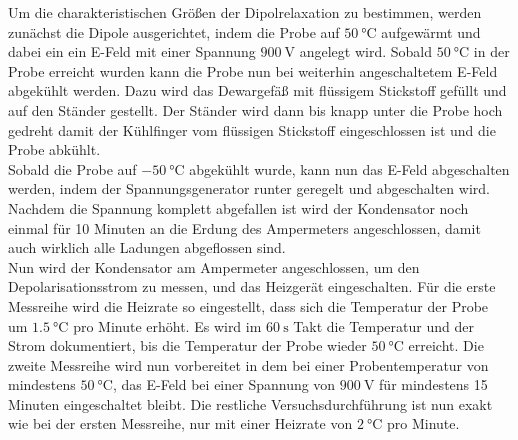     Um die charakteristischen Größen der Dipolrelaxation zu bestimmen, 
    werden zunächst die Dipole ausgerichtet, indem die Probe auf $\SI{50}{\celsius}$ aufgewärmt und dabei ein ein E-Feld mit einer Spannung $\SI{900}{\volt}$ angelegt wird.
    Sobald $\SI{50}{\celsius}$ in der Probe erreicht wurden kann die Probe nun bei weiterhin angeschaltetem E-Feld abgekühlt werden.
    Dazu wird das Dewargefäß mit flüssigem Stickstoff gefüllt und auf den Ständer gestellt.
    Der Ständer wird dann bis knapp unter die Probe hoch gedreht damit der Kühlfinger vom flüssigen Stickstoff eingeschlossen ist und die Probe abkühlt.\\
    Sobald die Probe auf $\SI{-50}{\celsius}$ abgekühlt wurde, kann nun das E-Feld abgeschalten werden, indem der Spannungsgenerator runter geregelt und abgeschalten wird.
    Nachdem die Spannung komplett abgefallen ist wird der Kondensator noch einmal für 10 Minuten an die Erdung des Ampermeters angeschlossen, damit auch wirklich alle Ladungen abgeflossen sind.\\
    Nun wird der Kondensator am Ampermeter angeschlossen, um den Depolarisationsstrom zu messen, und das Heizgerät eingeschalten.
    Für die erste Messreihe wird die Heizrate so eingestellt, dass sich die Temperatur der Probe um $\SI{1.5}{\celsius}$ pro Minute erhöht.
    Es wird im $\SI{60}{\second}$ Takt die Temperatur und der Strom dokumentiert, bis die Temperatur der Probe wieder $\SI{50}{\celsius}$ erreicht. 
    Die zweite Messreihe wird nun vorbereitet in dem bei einer Probentemperatur von mindestens $\SI{50}{\celsius}$, das E-Feld bei einer Spannung von $\SI{900}{\volt}$ für mindestens 15 Minuten eingeschaltet bleibt.
    Die restliche Versuchsdurchführung ist nun exakt wie bei der ersten Messreihe, nur mit einer Heizrate von $\SI{2}{\celsius}$ pro Minute.
